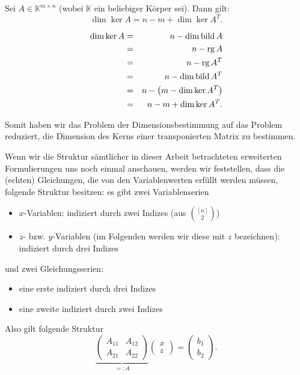 \documentclass[10p,a4paper,BCOR = 12mm, DIV=15]{scrbook}
\begin{document}
\begin{Sa}
\label{sa:dim2}
Sei $A\in \mathbb{K}^{m \times n}$ (wobei $\mathbb{K}$ ein beliebiger Körper sei). Dann gilt:
\begin{displaymath}
\dim \ker A = n-m+\dim \ker A^T.
\end{displaymath}
\end{Sa}
\begin{bew}
\begin{eqnarray*}
\dim \ker A & = & n - \dim \operatorname{bild} A \\
& = & n - \operatorname{rg} A \\
& = & n - \operatorname{rg} A^T \\
& = & n - \dim \operatorname{bild} A^T \\
& = & n - \left(m - \dim \ker A^T\right) \\
& = & n - m+\dim \ker A^T.
\end{eqnarray*}
\end{bew}

Somit haben wir das Problem der Dimensionsbestimmung auf das Problem reduziert, die Dimension des Kerns einer transponierten Matrix zu bestimmen.

Wenn wir die Struktur sämtlicher in dieser Arbeit betrachteten erweiterten Formulierungen uns noch einmal anschauen, werden wir feststellen, dass die (echten) Gleichungen, die von den Variablenwerten erfüllt werden müssen, folgende Struktur besitzen: es gibt zwei Variablenserien
\begin{itemize}
\item $x$-Variablen: indiziert durch zwei Indizes (aus ${\left[n\right] \choose 2}$)
\item $z$- bzw. $y$-Variablen (im Folgenden werden wir diese mit $z$ bezeichnen): indiziert durch drei Indizes
\end{itemize}
und zwei Gleichungsserien:
\begin{itemize}
\item eine erste indiziert durch drei Indizes
\item eine zweite indiziert durch zwei Indizes
\end{itemize}

Also gilt folgende Struktur
\begin{displaymath}
\underbrace{\left(
\begin{array}{cc}
A_{11} & A_{12} \\
A_{21} & A_{22}
\end{array}
\right)}_{=: A} \left(
\begin{array}{c}
x \\
z
\end{array}
\right)
= 
\left(
\begin{array}{c}
b_{1} \\
b_{2}
\end{array}
\right).
\end{displaymath}
\end{document}
